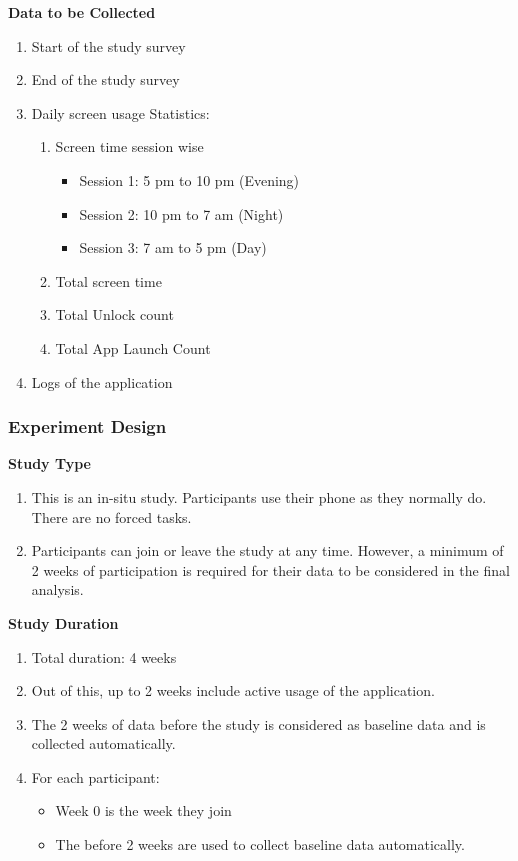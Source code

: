 \documentclass{article}
\begin{document}
\textbf{Data to be Collected}
\begin{enumerate}
    \item Start of the study survey
    \item End of the study survey
    \item Daily screen usage Statistics:
    \begin{enumerate}
        \item Screen time session wise
        \begin{itemize}
            \item Session 1: 5 pm to 10 pm (Evening)
            \item Session 2: 10 pm to 7 am (Night)
            \item Session 3: 7 am to 5 pm (Day)
        \end{itemize}
        \item Total screen time
        \item Total Unlock count
        \item Total App Launch Count
    \end{enumerate}
    \item Logs of the application
\end{enumerate}

\subsubsection{Experiment Design}

\textbf{Study Type}
\begin{enumerate}
    \item This is an in-situ study. Participants use their phone as they normally do. There are no forced tasks.
    \item Participants can join or leave the study at any time. However, a minimum of 2 weeks of participation is required for their data to be considered in the final analysis.
\end{enumerate}

\textbf{Study Duration}
\begin{enumerate}
    \item Total duration: 4 weeks
    \item Out of this, up to 2 weeks include active usage of the application.
    \item The 2 weeks of data before the study is considered as baseline data and is collected automatically.
    \item For each participant:
    \begin{itemize}
        \item Week 0 is the week they join
        \item The before 2 weeks are used to collect baseline data automatically.
    \end{itemize}
\end{enumerate}
\end{document}
